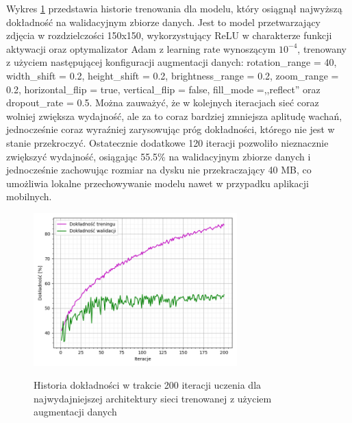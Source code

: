 Wykres \ref{pic:5.5} przedstawia historie trenowania dla modelu, który osiągnął najwyższą dokładność na walidacyjnym zbiorze danych. Jest to model przetwarzający zdjęcia w rozdzielczości 150x150, wykorzystujący ReLU w charakterze funkcji aktywacji oraz optymalizator Adam z learning rate wynoszącym $10^{-4}$, trenowany z użyciem następującej konfiguracji augmentacji danych: rotation\_range = 40, width\_shift = 0.2, height\_shift = 0.2, brightness\_range = 0.2, zoom\_range = 0.2, horizontal\_flip = true, vertical\_flip = false, fill\_mode =,,reflect'' oraz dropout\_rate = 0.5. Można zauważyć, że w kolejnych iteracjach sieć coraz wolniej zwiększa wydajność, ale za to coraz bardziej zmniejsza aplitudę wachań, jednocześnie coraz wyraźniej zarysowując próg dokładności, którego nie jest w stanie przekroczyć. Ostatecznie dodatkowe 120 iteracji pozwoliło nieznacznie zwiększyć wydajność, osiągając 55.5\% na walidacyjnym zbiorze danych i jednocześnie zachowując rozmiar na dysku nie przekraczający 40 MB, co umożliwia lokalne przechowywanie modelu nawet w przypadku aplikacji mobilnych.

\begin{figure}[H]
    \caption{Historia dokładności w trakcie 200 iteracji uczenia dla najwydajniejszej architektury sieci trenowanej z użyciem augmentacji danych}
    \centering
    \includegraphics[width=0.7\textwidth]{wykres5.png}
    \label{pic:5.5}
\end{figure}

